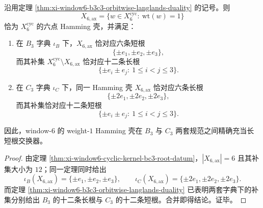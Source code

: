 \begin{corollary}\label{cor:xi-window6-hamming-shell-b3c3-length-swap}
沿用定理 \ref{thm:xi-window6-b3c3-orbitwise-langlands-duality} 的记号。则
\[
X_{6,\mathrm{ax}}
=
\{w\in X_6^{\mathrm{cyc}}:\ \mathrm{wt}(w)=1\}
\]
恰为 \(X_6^{\mathrm{cyc}}\) 的六点 Hamming 壳，并满足：
\begin{enumerate}
  \item 在 \(B_3\) 字典 \(\iota_B\) 下，\(X_{6,\mathrm{ax}}\) 恰对应六条短根
  \[
  \{\pm e_1,\pm e_2,\pm e_3\},
  \]
  而其补集 \(X_6^{\mathrm{cyc}}\setminus X_{6,\mathrm{ax}}\) 恰对应十二条长根
  \[
  \{\pm e_i\pm e_j:\ 1\le i<j\le 3\}.
  \]
  \item 在 \(C_3\) 字典 \(\iota_C\) 下，同一 Hamming 壳 \(X_{6,\mathrm{ax}}\) 恰对应六条长根
  \[
  \{\pm 2e_1,\pm 2e_2,\pm 2e_3\},
  \]
  而其补集恰对应十二条短根
  \[
  \{\pm e_i\pm e_j:\ 1\le i<j\le 3\}.
  \]
\end{enumerate}
因此，window-\(6\) 的 weight-\(1\) Hamming 壳在 \(B_3\) 与 \(C_3\) 两套规范之间精确充当长短根交换器。
\end{corollary}
\begin{proof}
由定理 \ref{thm:xi-window6-cyclic-kernel-bc3-root-datum}，\(|X_{6,\mathrm{ax}}|=6\) 且其补集大小为 \(12\)；同一定理同时给出
\[
\iota_B(X_{6,\mathrm{ax}})
=
\{\pm e_1,\pm e_2,\pm e_3\},
\qquad
\iota_C(X_{6,\mathrm{ax}})
=
\{\pm 2e_1,\pm 2e_2,\pm 2e_3\}.
\]
而定理 \ref{thm:xi-window6-b3c3-orbitwise-langlands-duality} 已表明两套字典下的补集分别给出 \(B_3\) 的十二条长根与 \(C_3\) 的十二条短根。合并即得结论。证毕。
\end{proof}


